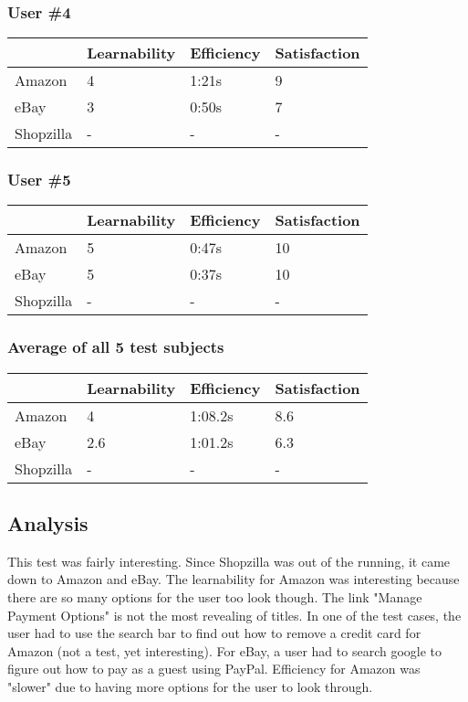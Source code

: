 \documentclass[11pt, oneside]{article}   	%
\begin{document}
\subsubsection{User \#4}

\begin{tabular}{| l | l | l | l |}
    \hline
     & Learnability & Efficiency & Satisfaction \\ \hline
    Amazon & 4 & 1:21s & 9 \\ \hline
    eBay & 3 & 0:50s & 7 \\ \hline
    Shopzilla & - & - & - \\\hline
\end{tabular}

\subsubsection{User \#5}

\begin{tabular}{| l | l | l | l |}
    \hline
     & Learnability & Efficiency & Satisfaction \\ \hline
    Amazon & 5 & 0:47s & 10 \\ \hline
    eBay & 5 & 0:37s & 10 \\ \hline
    Shopzilla & - & - & - \\\hline
\end{tabular}

\subsubsection{Average of all 5 test subjects}

\begin{tabular}{| l | l | l | l |}
    \hline
     & Learnability & Efficiency & Satisfaction \\ \hline
    Amazon & 4 & 1:08.2s & 8.6 \\ \hline
    eBay & 2.6 & 1:01.2s & 6.3 \\ \hline
    Shopzilla & - & - & - \\\hline
\end{tabular}

\subsection{Analysis}

This test was fairly interesting. Since Shopzilla was out of the running, it came down to Amazon and eBay. The learnability for Amazon was interesting because there are so many options for the user too look though. The link "Manage Payment Options" is not the most revealing of titles. In one of the test cases, the user had to use the search bar to find out how to remove a credit card for Amazon (not a test, yet interesting). For eBay, a user had to search google to figure out how to pay as a guest using PayPal.  Efficiency for Amazon was "slower" due to having more options for the user to look through.
\end{document}
